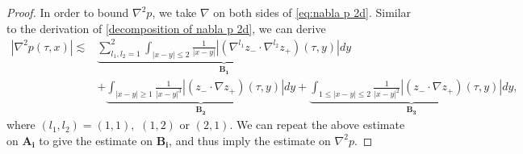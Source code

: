 \documentclass[10pt,reqno]{amsart}
\numberwithin{equation}{section}
\begin{document}
\begin{appendix}
\begin{proof}
	
	In order to bound $\nabla^2 p$, we take $\nabla$ on both sides of \eqref{eq:nabla p 2d}. Similar to the derivation of \eqref{decomposition of nabla p 2d}, we can derive
	\begin{align*}
		|\nabla^2 p(\tau,x)|
		\lesssim
		& \underbrace{\sum_{l_{1},l_{2}=1}^2 \int_{|x-y|\leqslant 2}\frac{1}{|x-y|}\left|\left(\nabla^{l_1} z_{-}\cdot\nabla^{l_2} z_{+}\right)(\tau,y)\right|dy}_{\mathbf{B_1}}\\
		&+\underbrace{\int_{|x-y|\geqslant 1}\frac{1}{|x-y|^3}\left| \left(z_{-}\cdot\nabla z_{+}\right)(\tau,y)\right|dy}_{\mathbf{B_2}}	+\underbrace{\int_{1\leqslant |x-y|\leqslant 2}\frac{1}{|x-y|^2}\left|\left(z_{-}\cdot\nabla z_{+}\right)(\tau,y)\right|dy}_{\mathbf{B_3}},
	\end{align*}
	where  $(l_1,l_2)=(1,1),$ $(1,2)$ or $(2,1)$. We can repeat the above estimate on $\mathbf{A_i}$ to give the estimate on $\mathbf{B_i}$, and thus imply the estimate on $\nabla^2 p$.
\end{proof}

	
\end{appendix}

 
	
\end{document}
